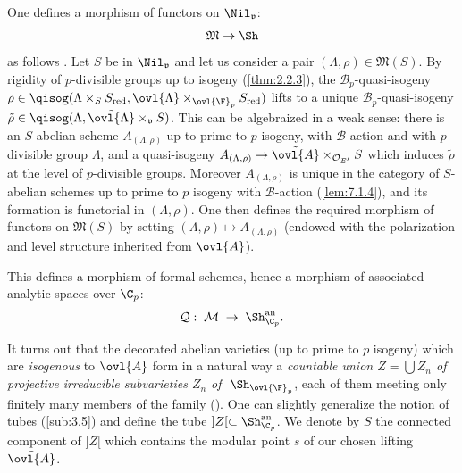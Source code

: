 \begin{para}\label{para:7.2.2}
 One defines a morphism of functors on $\Nil_\mathfrak{v}$: 
 \begin{equation*}
  {\mathfrak{M}} \rightarrow \Sh
 \end{equation*}
 as follows \cite[6.14]{psfpg}.
 Let $S$ be in $\Nil_\mathfrak{v}$ and let us consider a pair
 $(\Lambda,\rho)\in \mathfrak{M}(S)$. By rigidity of $p$-divisible
 groups up to isogeny (\ref{thm:2.2.3}), the
 $\mathcal{B}_p$-quasi-isogeny $\rho 
 \in \qisog(\Lambda\times_S S_{\mathrm{red}},
 \ovl{\Lambda}\times_{{\ovl{\F}}_p}S_{\mathrm{red}})$ lifts to a unique 
 $\mathcal{B}_p$-quasi-isogeny $\tilde{\rho}\in \qisog(\Lambda,
 \tilde{\ovl{\Lambda}}\times_\mathfrak{v}S)$. This can be algebraized in
 a weak sense: there is an $S$-abelian scheme $A_{(\Lambda,\rho)}$ up to
 prime to $p$ isogeny, with $\mathcal{B}$-action and with $p$-divisible
 group $\Lambda $, and a quasi-isogeny $A_{(\Lambda,\rho)}\rightarrow
 \tilde{\ovl{A}}\times_{\mathcal{O}_{E'}}S$ which induces $\tilde{\rho}$
 at the level of $p$-divisible groups. Moreover $A_{(\Lambda,\rho)}$ is
 unique in the category of $S$-abelian schemes up to prime to $p$ isogeny
 with $\mathcal{B}$-action (\ref{lem:7.1.4}), and its formation is
 functorial in 
 $(\Lambda,\rho)$. One then defines the required morphism of functors on
 $\mathfrak{M}(S)$ by setting $(\Lambda,\rho)\mapsto A_{(\Lambda,\rho)}$
 (endowed with the polarization and level structure inherited from $\ovl{A}$).

 This defines a morphism of formal schemes, hence a morphism
 of associated analytic spaces over $\C_p$:
 \begin{equation*}
  \mathcal{Q}:\;\mathcal{M}\;\rightarrow\; \Sh_{\C_p}^{\mathrm{an}}.
 \end{equation*}
\end{para}

\begin{para}\label{para:7.2.3}
 It turns out that the decorated abelian varieties (up to prime to $p$
 isogeny) which are {\it isogenous} to $\ovl{A}$ form in a natural way a
 {\it countable union $Z=\bigcup Z_n$ of projective irreducible
 subvarieties $Z_n$ of $\;\Sh_{\ovl{\F}_p}$}, each of them
 meeting only finitely many members of the family (\cite[6.23, 6.34]{psfpg}).
 One can slightly generalize the notion of tubes (\ref{sub:3.5}) and
 define the tube $]Z[\subset \Sh_{\C_p}^{\mathrm{an}}$. We denote by $S$ the
 connected component of $]Z[$ which contains the modular point $s$ of our
 chosen lifting $\tilde{\ovl{A}}$.
\end{para}

